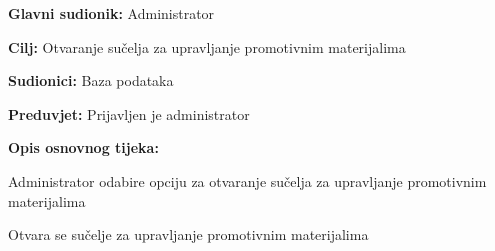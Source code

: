 					\noindent {}
					\begin{packed_item}
						
						\item \textbf{Glavni sudionik: }Administrator
						\item  \textbf{Cilj:} Otvaranje sučelja za upravljanje promotivnim materijalima
						\item  \textbf{Sudionici:} Baza podataka
						\item  \textbf{Preduvjet:} Prijavljen je administrator
						\item  \textbf{Opis osnovnog tijeka:}
						
						\item[] \begin{packed_enum}
							
							\item Administrator odabire opciju za otvaranje sučelja za upravljanje promotivnim materijalima
							\item Otvara se sučelje za upravljanje promotivnim materijalima
						\end{packed_enum}
						
					\end{packed_item}
					
